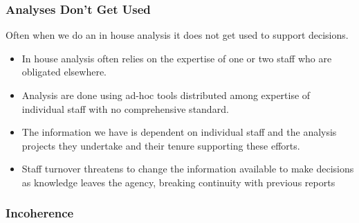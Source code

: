 \documentclass{beamer}
\begin{document}
{
\begin{frame}[plain]
\end{frame}
}


\begin{frame}
\frametitle{Analyses Don't Get Used}
Often when we do an in house analysis it does not get used to support decisions.
  \begin{itemize}
  \item In house analysis often relies on the expertise of one or two staff who are obligated elsewhere. 
  \pause
  \item Analysis are done using ad-hoc tools distributed among expertise of individual staff with no comprehensive standard. 
  \pause
  \item The information we have is dependent on individual staff and the analysis projects they undertake and their tenure supporting these efforts.
  \pause
  \item Staff turnover threatens to change the information available to make decisions as knowledge leaves the agency, breaking continuity with previous reports
  \pause
  \end{itemize}
\end{frame}

{
\begin{frame}[plain]
\frametitle{Incoherence}
\end{frame}
}
\end{document}
